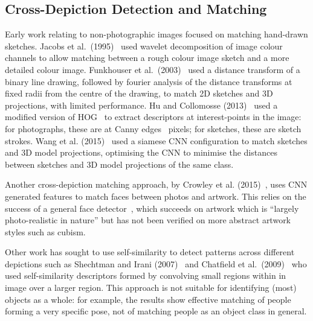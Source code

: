 \documentclass[runningheads]{llncs}
\begin{document}
\subsection{Cross-Depiction Detection and Matching}
Early work relating to non-photographic images focused on matching hand-drawn sketches.
Jacobs et al.\ (1995)~\cite{jacobs1995fast} used wavelet decomposition of image colour channels to allow matching between a rough colour image sketch and a more detailed colour image.
Funkhouser et al.\ (2003)~\cite{funkhouser2003search} used a distance transform of a binary line drawing, followed by fourier analysis of the distance transforms at fixed radii from the centre of the drawing, to match 2D sketches and 3D projections, with limited performance.
Hu and Collomosse (2013)~\cite{hu2013performance} used a modified version of \ac{HOG}~\cite{dalal2005histograms} to extract descriptors at interest-points in the image: for photographs, these are at Canny edges~\cite{canny1986computational} pixels; for sketches, these are sketch strokes.
Wang et al. (2015)~\cite{wang2015sketch} used a siamese \ac{CNN} configuration to match sketches and 3D model projections, optimising the \ac{CNN} to minimise the distances between sketches and 3D model projections of the same class.

Another cross-depiction matching approach, by Crowley et al. (2015)~\cite{Crowley15}, uses \ac{CNN} generated features to match faces between photos and artwork.
This relies on the success of a general face detector~\cite{parkhi2015deep}, which succeeds on artwork which is ``largely photo-realistic in nature'' but has not been verified on more abstract artwork styles such as cubism.

Other work has sought to use self-similarity to detect patterns across different depictions such as Shechtman and Irani (2007)~\cite{shechtman2007matching} and  Chatfield et al.\ (2009)~\cite{chatfield2009efficient} who used self-similarity descriptors formed by convolving small regions within in image over a larger region.
This approach is not suitable for identifying (most) objects as a whole: for example, the results show effective matching of people forming a very specific pose, not of matching people as an object class in general.
\end{document}
